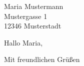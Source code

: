 \documentclass[12pt]{scrlttr2}
\begin{document}
\begin{letter}{Maria Mustermann \\ Mustergasse 1 \\ 12346 Musterstadt}
 
\opening{Hallo Maria,}
 
\blindtext[1]
 
\closing{Mit freundlichen Grüßen}
 
\end{letter}
\end{document}
